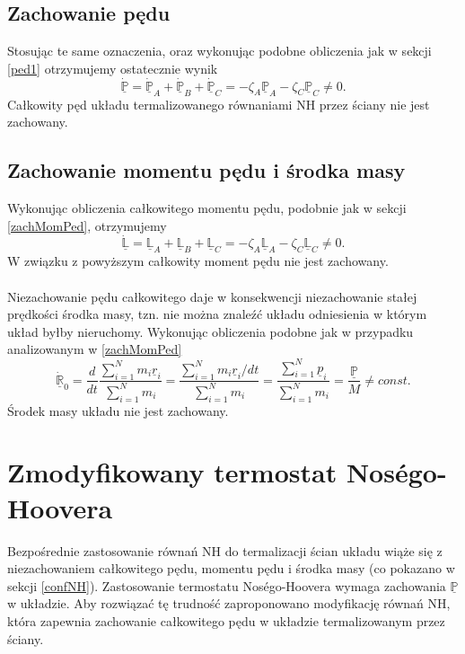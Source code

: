 \documentclass[12pt,a4paper,openright]{report} %
\begin{document}
\subsection{Zachowanie pędu}
\label{ped2}
\noindent
Stosując te same oznaczenia, oraz wykonując podobne obliczenia jak w sekcji \ref{ped1} otrzymujemy ostatecznie wynik
\begin{equation}
\underline{\dot{\mathbb{P}}}=\underline{\dot{\mathbb{P}}}_A+\underline{\dot{\mathbb{P}}}_B+\underline{\dot{\mathbb{P}}}_C=-\zeta_A
\underline{\mathbb{P}}_A-\zeta_C \underline{\mathbb{P}}_C \ne 0.
\end{equation}
Całkowity pęd układu termalizowanego równaniami NH przez ściany nie jest zachowany.
\subsection{Zachowanie momentu pędu i środka masy}
%
\label{zachMomPed2}
\noindent
Wykonując obliczenia całkowitego momentu pędu, podobnie jak w sekcji \ref{zachMomPed}, otrzymujemy
%
\begin{equation}
\underline{\mathbb{\dot{L}}}= \underline{\mathbb{L}}_A  +  \underline{\mathbb{L}}_B +  \underline{\mathbb{L}}_C = -\zeta_{A} \underline{\mathbb{L}}_A -\zeta_{C} \underline{\mathbb{L}}_C \ne 0.
\end{equation}
%
W związku z powyższym całkowity moment pędu nie jest zachowany.
%
\\
\\
Niezachowanie pędu całkowitego daje w konsekwencji niezachowanie stałej prędkości środka masy, tzn. nie można znaleźć układu odniesienia w którym układ byłby nieruchomy. Wykonując obliczenia podobne jak w przypadku analizowanym w \ref{zachMomPed}
\begin{equation}
{\underline{\mathbb{\dot{R}}}_0}=\frac{d}{dt} \frac{\sum_{i=1}^{N} m_i \underline{r}_i }{\sum_{i=1}^{N} m_i}=\frac{\sum_{i=1}^{N}
m_i { \underline{r}_i}/{dt} }{\sum_{i=1}^{N} m_i}=\frac{\sum_{i=1}^{N} \underline{p}_i }{\sum_{i=1}^{N} m_i}=\frac{\underline{\mathbb{P}}}{M} \neq const.
\label{ZachSrodkaM-ZT}
\end{equation}
Środek masy układu nie jest zachowany. 
%
\section{Zmodyfikowany termostat Nos\'{e}go-Hoovera}
\label{modNH}
%
Bezpośrednie zastosowanie równań NH do termalizacji ścian układu wiąże się z niezachowaniem całkowitego pędu, momentu pędu i środka masy (co pokazano w sekcji \ref{confNH}). Zastosowanie termostatu Nos\'{e}go-Hoovera wymaga zachowania $\underline{\mathbb{P}}$ w układzie. Aby rozwiązać tę trudność zaproponowano modyfikację równań NH, która zapewnia zachowanie całkowitego pędu w układzie termalizowanym przez ściany.
\end{document}
